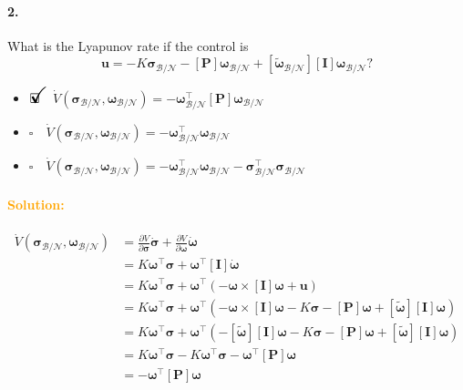 \documentclass[12pt, a4paper]{article}
\newcommand{\ans}{\item[]$\rlap{\LARGE{\checkmark}}\square\quad$}
\newcommand{\noans}{\item[]$\square\quad$}
\begin{document}
\paragraph{2.}
What is the Lyapunov rate if the control is
$$\bm{u} = -K \bm{\sigma}_{\mathcal{B}/\mathcal{N}} - [\bm{P}]\bm{\omega}_{\mathcal{B}/\mathcal{N}} + [\tilde{\bm{\omega}}_{\mathcal{B}/\mathcal{N}}][\bm{I}]\bm{\omega}_{\mathcal{B}/\mathcal{N}}?$$

\begin{itemize}
\ans $\dot{V}(\bm{\sigma}_{\mathcal{B}/\mathcal{N}},\bm{\omega}_{\mathcal{B}/\mathcal{N}}) = -\bm{\omega}^{\intercal}_{\mathcal{B}/\mathcal{N}}[\bm{P}]\bm{\omega}_{\mathcal{B}/\mathcal{N}}$
\noans $\dot{V}(\bm{\sigma}_{\mathcal{B}/\mathcal{N}},\bm{\omega}_{\mathcal{B}/\mathcal{N}}) = -\bm{\omega}^{\intercal}_{\mathcal{B}/\mathcal{N}}\bm{\omega}_{\mathcal{B}/\mathcal{N}}$
\noans $\dot{V}(\bm{\sigma}_{\mathcal{B}/\mathcal{N}},\bm{\omega}_{\mathcal{B}/\mathcal{N}}) = -\bm{\omega}^{\intercal}_{\mathcal{B}/\mathcal{N}}\bm{\omega}_{\mathcal{B}/\mathcal{N}} - \bm{\sigma}^{\intercal}_{\mathcal{B}/\mathcal{N}}\bm{\sigma}_{\mathcal{B}/\mathcal{N}}$
\end{itemize}

\paragraph{\textcolor{orange}{Solution:}}
\begin{equation*}
    \begin{split}
        \dot{V}(\bm{\sigma}_{\mathcal{B}/\mathcal{N}},\bm{\omega}_{\mathcal{B}/\mathcal{N}}) &= \frac{\partial V}{\partial\bm{\sigma}}\dot{\bm{\sigma}} + \frac{\partial V}{\partial\bm{\omega}}\dot{\bm{\omega}}\\
        &= K\bm{\omega}^{\intercal}\bm{\sigma} + \bm{\omega}^{\intercal}[\bm{I}]\dot{\bm{\omega}}\\
        &= K\bm{\omega}^{\intercal}\bm{\sigma} + \bm{\omega}^{\intercal}(-\bm{\omega}\times[\bm{I}]\bm{\omega} + \bm{u})\\
        &= K\bm{\omega}^{\intercal}\bm{\sigma} + \bm{\omega}^{\intercal}(-\bm{\omega}\times[\bm{I}]\bm{\omega} - K\bm{\sigma}-[\bm{P}]\bm{\omega} + [\tilde{\bm{\omega}}][\bm{I}]\bm{\omega})\\
        &= K\bm{\omega}^{\intercal}\bm{\sigma} + \bm{\omega}^{\intercal}(-[\tilde{\bm{\omega}}][\bm{I}]\bm{\omega} - K\bm{\sigma}-[\bm{P}]\bm{\omega} + [\tilde{\bm{\omega}}][\bm{I}]\bm{\omega})\\
        &= K\bm{\omega}^{\intercal}\bm{\sigma} - K\bm{\omega}^{\intercal}\bm{\sigma}-\bm{\omega}^{\intercal}[\bm{P}]\bm{\omega}\\
        &=-\bm{\omega}^{\intercal}[\bm{P}]\bm{\omega}\\
    \end{split}
\end{equation*}
\end{document}
